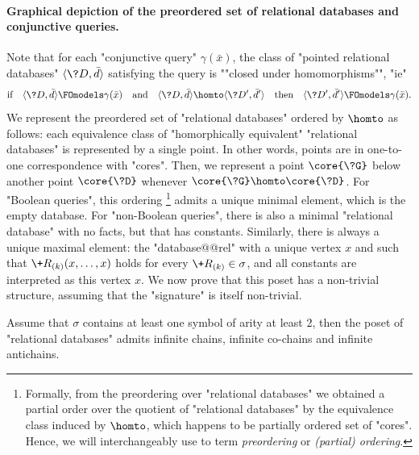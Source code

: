 \paragraph*{Graphical depiction of the preordered set of relational databases and conjunctive queries.}
Note that for each "conjunctive query" $\gamma(\bar x)$, the class of
"pointed relational databases" $\tup{\?D, \bar d}$ satisfying the query
is \AP""closed under homomorphisms"", "ie"
\[
	\text{if}\quad \tup{\?D, \bar d} \FOmodels \gamma(\bar x)
	\quad\text{and}\quad \tup{\?D, \bar d} \homto \tup{\?D', \bar d'}
	\quad\text{then}\quad \tup{\?D', \bar d'} \FOmodels \gamma(\bar x).
\]
We represent the preordered set of "relational databases" ordered by $\homto$ as follows:
each equivalence class of "homorphically equivalent" "relational databases" is
represented by a single point. In other words, points are in one-to-one correspondence
with "cores". Then, we represent a point $\core{\?G}$ below another point $\core{\?D}$
whenever $\core{\?G} \homto \core{\?D}$.
For "Boolean queries", this ordering%
\footnote{Formally, from the preordering over "relational databases" we obtained a partial
order over the quotient of "relational databases" by the equivalence class induced by $\homto$,
which happens to be partially ordered set of "cores". Hence, we will interchangeably
use to term \emph{preordering} or \emph{(partial) ordering}.}
admits a unique minimal element, which is the empty database.
For "non-Boolean queries", there is also a minimal "relational database" with
no facts, but that has constants.%
Similarly, there is always a unique maximal element: the "database@@rel" with
a unique vertex $x$ and such that $\+R_{(k)}(x,\dotsc,x)$ holds for
every $\+R_{(k)} \in \sigma$, and all constants are interpreted as this vertex $x$.
We now prove that this poset has a non-trivial structure, assuming that the "signature"
is itself non-trivial.

\begin{proposition}
	\AP\label{prop:poset-reldb}
	Assume that $\sigma$ contains at least one symbol of arity at least 2,
	then the poset of "relational databases"
	admits infinite chains, infinite co-chains and infinite antichains.
\end{proposition}

